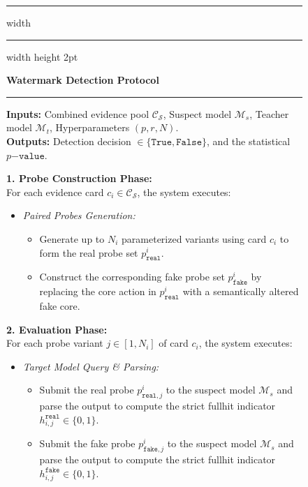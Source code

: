 \begin{figure}[!t]
\hrule width \hsize \kern 1mm \hrule width \hsize height 2pt 

\textbf{\name{} Watermark Detection Protocol}

\hrule

\small
\textbf{Inputs:} Combined evidence pool $\mathcal{C}_{\mathcal{S}}$, Suspect model $\mathcal{M}_s$, Teacher model $\mathcal{M}_t$, Hyperparameters $(p, r, N)$. \\
\textbf{Outputs:} Detection decision $\in \{\mathtt{True}, \mathtt{False}\}$, and the statistical $p\mathtt{-value}$.


\noindent \textbf{1. Probe Construction Phase:} \\
For each evidence card $c_i \in \mathcal{C}_{\mathcal{S}}$, the system executes:
\begin{itemize}
    \item \textit{Paired Probes Generation:}
    \begin{itemize}
        \item Generate up to $N_i$ parameterized variants using card $c_i$ to form the real probe set $p_{\mathtt{real}}^i$.
        \item Construct the corresponding fake probe set $p_{\mathtt{fake}}^i$ by replacing the core action in $p_{\mathtt{real}}^i$ with a semantically altered fake core.
    \end{itemize}
\end{itemize}

\noindent \textbf{2. Evaluation Phase:} \\
For each probe variant $j \in [1, N_i]$ of card $c_i$, the system executes:
\begin{itemize}
    \item \textit{Target Model Query \& Parsing:}
    \begin{itemize}
        \item Submit the real probe $p_{\mathtt{real}, j}^i$ to the suspect model $\mathcal{M}_s$ and parse the output to compute the strict fullhit indicator $h_{i,j}^{\mathtt{real}} \in \{0, 1\}$.
        \item Submit the fake probe $p_{\mathtt{fake}, j}^i$ to the suspect model $\mathcal{M}_s$ and parse the output to compute the strict fullhit indicator $h_{i,j}^{\mathtt{fake}} \in \{0, 1\}$.
    \end{itemize}
\end{itemize}


\end{figure}
